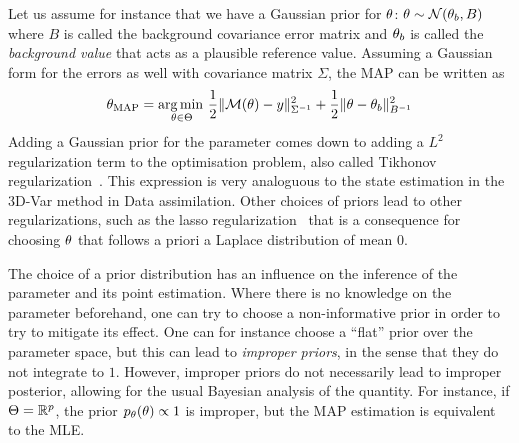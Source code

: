 \documentclass[../../Main_ManuscritThese.tex]{subfiles}
\begin{document}
Let us assume for instance that we have a Gaussian prior for $\theta$:
$\theta \sim \mathcal{N}(\theta_{b},B)$ where $B$ is called the
background covariance error matrix and $\theta_b$ is called the
\emph{background value} that acts as a plausible reference
value. Assuming a Gaussian form for the errors as well with covariance
matrix $\Sigma$, the MAP can be written as
\begin{equation}
  {\theta}_{\mathrm{MAP}} = \operatorname*{arg\,min \,}_{\theta \in \Theta} \frac{1}{2}\| \mathcal{M}(\theta) - y\|^2_{\Sigma^{-1}} + \frac{1}{2}\|\theta - \theta_b\|^2_{B^{-1}}
\end{equation}
Adding a Gaussian prior for the parameter comes down to adding a $L^2$
regularization term to the optimisation problem, also called Tikhonov
regularization~\citep{tikhonov_solutions_1977}. This expression is very
analoguous to the state estimation in the 3D-Var method in Data
assimilation.  Other choices of priors lead to other regularizations,
such as the lasso regularization~\citep{tibshirani_regression_2011}
that is a consequence for choosing $\theta$ that follows a priori a
Laplace distribution of mean $0$.

The choice of a prior distribution has an influence on the inference
of the parameter and its point estimation. Where there is no knowledge
on the parameter beforehand, one can try to choose a non-informative
prior in order to try to mitigate its effect. One can for instance
choose a ``flat'' prior over the parameter space, but this can lead to
\emph{improper priors}, in the sense that they do not integrate to
$1$. However, improper priors do not necessarily lead to improper
posterior, allowing for the usual Bayesian analysis of the
quantity. For instance, if $\Theta=\mathbb{R}^p$, the prior
$p_{\theta}(\theta) \propto 1$ is improper, but the MAP estimation is
equivalent to the MLE.

\end{document}

